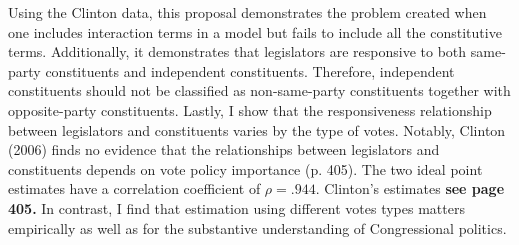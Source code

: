 \documentclass[10pt,letterpaper]{article}
\begin{document}
Using the Clinton data, this proposal demonstrates the problem created when one includes interaction terms in a model but fails to include all the constitutive terms. Additionally, it demonstrates that legislators are responsive to both same-party constituents and independent constituents. Therefore, independent constituents should not be classified as non-same-party constituents together with opposite-party constituents. Lastly, I show that the responsiveness relationship between legislators and constituents varies by the type of votes. Notably, Clinton (2006) finds no evidence that the relationships between legislators and constituents depends on vote policy importance (p. 405). The two ideal point estimates have a correlation coefficient of $\rho = .944$. Clinton's estimates \textbf{see page 405.} In contrast, I find that estimation using different votes types matters empirically as well as for the substantive understanding of Congressional politics.
\end{document}
